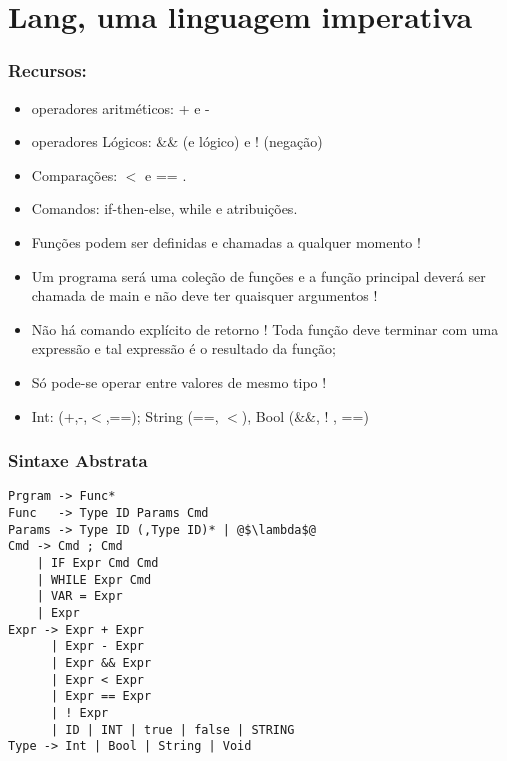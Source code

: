 \documentclass{beamer}
\begin{document}

\section{Lang, uma linguagem imperativa}


\begin{frame}
   \frametitle{Recursos:}
   \begin{itemize}
    \item operadores aritméticos: + e -
    \item operadores Lógicos: \&\& (e lógico) e ! (negação)
    \item Comparações: $<$ e == .
    \item Comandos: if-then-else, while e atribuições.
    \item Funções podem ser definidas e chamadas a qualquer momento !
    \item Um programa será uma coleção de funções e a função principal deverá ser chamada de main  e não deve ter quaisquer argumentos !
    \item Não há comando explícito de retorno ! Toda função deve terminar com uma expressão e tal expressão é o resultado da função;
    \item Só pode-se operar entre valores de mesmo tipo !
    \item Int: (+,-,$<$,==); String (==, $<$), Bool (\&\&, ! , ==)
   \end{itemize}
\end{frame}

\begin{frame}[fragile]
   \frametitle{Sintaxe Abstrata}
  \begin{lstlisting}[style=ast,escapechar=@]
Prgram -> Func*
Func   -> Type ID Params Cmd  
Params -> Type ID (,Type ID)* | @$\lambda$@
Cmd -> Cmd ; Cmd
    | IF Expr Cmd Cmd
    | WHILE Expr Cmd
    | VAR = Expr
    | Expr
Expr -> Expr + Expr
      | Expr - Expr
      | Expr && Expr
      | Expr < Expr
      | Expr == Expr
      | ! Expr
      | ID | INT | true | false | STRING
Type -> Int | Bool | String | Void
    
\end{lstlisting}
\end{frame}
\end{document}
